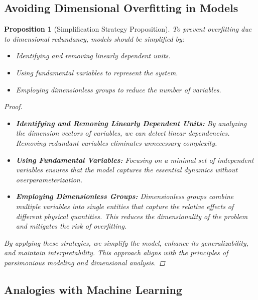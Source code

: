 \documentclass{article}
\newtheorem{proposition}{Proposition}[section]
\theoremstyle{definition}
\theoremstyle{remark}
\begin{document}
	\subsection{Avoiding Dimensional Overfitting in Models}
	
	\begin{proposition}[Simplification Strategy Proposition]
		To prevent overfitting due to dimensional redundancy, models should be simplified by:
		\begin{itemize}
			\item Identifying and removing linearly dependent units.
			\item Using fundamental variables to represent the system.
			\item Employing dimensionless groups to reduce the number of variables.
		\end{itemize}
		
		\begin{proof}
			\begin{itemize}
				\item \textbf{Identifying and Removing Linearly Dependent Units:} By analyzing the dimension vectors of variables, we can detect linear dependencies. Removing redundant variables eliminates unnecessary complexity.
				
				\item \textbf{Using Fundamental Variables:} Focusing on a minimal set of independent variables ensures that the model captures the essential dynamics without overparameterization.
				
				\item \textbf{Employing Dimensionless Groups:} Dimensionless groups combine multiple variables into single entities that capture the relative effects of different physical quantities. This reduces the dimensionality of the problem and mitigates the risk of overfitting.
			\end{itemize}
			
			By applying these strategies, we simplify the model, enhance its generalizability, and maintain interpretability. This approach aligns with the principles of parsimonious modeling and dimensional analysis.
		\end{proof}
	\end{proposition}
	
	\subsection{Analogies with Machine Learning}
	
\end{document}
